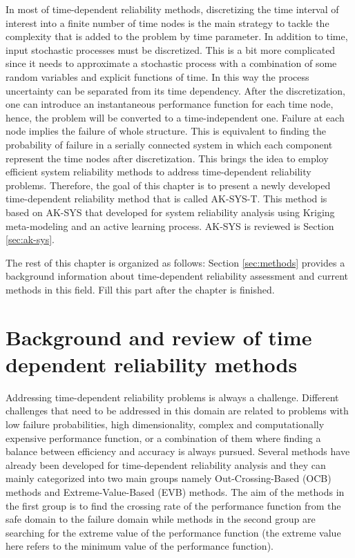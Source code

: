 In most of time-dependent reliability methods, discretizing the time interval of interest into a finite number of time nodes is the main strategy to tackle the 
complexity that is added to the problem by time parameter. In addition to time, input stochastic processes must be discretized. This is a bit more complicated
since it needs to approximate a stochastic process with a combination of some random variables and explicit functions of time. In this way the process uncertainty can
be separated from its time dependency. After the discretization, one can introduce an instantaneous performance function for each time node, hence, the problem will 
be converted to a time-independent one. Failure at each node implies the failure of whole structure. This is equivalent to finding the probability of failure in a 
serially connected system in which each component represent the time nodes after discretization. This brings the idea to employ efficient system reliability 
methods to address time-dependent reliability problems. Therefore, the goal of this chapter is to present a newly developed time-dependent reliability method that is 
called AK-SYS-T. This method is based on AK-SYS that developed for system reliability analysis using Kriging meta-modeling and an active learning process. AK-SYS is
reviewed is Section \ref{sec:ak-sys}. 

The rest of this chapter is organized as follows: Section \ref{sec:methods} provides a background information about time-dependent reliability assessment and current 
methods in this field. Fill this part after the chapter is finished. 


\section{Background and review of time dependent reliability methods}
\label{sec:TDmethods}

\noindent
Addressing time-dependent reliability problems is always a challenge. Different challenges that need to be addressed in this domain are related to problems with low 
failure probabilities, high dimensionality, complex and computationally expensive performance function, or a combination of them where finding a balance between 
efficiency and accuracy is always pursued. Several methods have already been developed for time-dependent reliability analysis and they can mainly categorized into 
two main groups namely Out-Crossing-Based (OCB) methods and Extreme-Value-Based (EVB) methods. The aim of the methods in the first group is to find the crossing rate
of the performance function from the safe domain to the failure domain while methods in the second group are searching for the extreme value of the performance 
function (the extreme value here refers to the minimum value of the performance function). 

